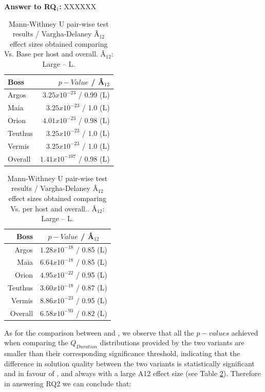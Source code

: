 \textbf{Answer to RQ$_1$:}   XXXXXX


\begin{table}[tb]
	\centering
	\caption{Mann-Withney U pair-wise test results / Vargha-Delaney Â$_{12}$ effect sizes obtained comparing \simhotep{} Vs. Base per host and overall. Â$_{12}$: Large -- L.}
	\label{tab:resultsWilcEffRQ1}
	\begin{tabular}{@{}lr@{}}
		\toprule
		Boss    & $p-Value$ / Â$_{12}$           \\ \midrule 
		Argos   & $3.25x10^{-23}$  / 0.99 (L)    \\
		Maia    & $3.25x10^{-23}$  /  1.0 (L)    \\
		Orion   & $4.01x10^{-23}$  / 0.98 (L)    \\
		Teuthus & $3.25x10^{-23}$  /  1.0 (L)    \\
		Vermis  & $3.25x10^{-23}$  /  1.0 (L)    \\
		Overall & $1.41x10^{-107}$ / 0.98 (L)    \\
		\bottomrule
	\end{tabular}
\end{table}

\begin{table}[tb]
    \centering
    \caption{Mann-Withney U pair-wise test results / Vargha-Delaney Â$_{12}$ effect sizes obtained comparing \simhotep{} Vs. \timhotep{} per host and overall.. Â$_{12}$: Large -- L.}
	\label{tab:resultsWilcEffRQ2}
    \begin{tabular}{@{}rc@{}}
    \toprule
    Boss    & $p-Value$ / Â$_{12}$           \\ \midrule 
    Argos   & $1.28x10^{-18}$ / 0.85 (L)     \\
    Maia    & $6.64x10^{-18}$ / 0.85 (L)     \\
    Orion   & $4.95x10^{-22}$ / 0.95 (L)     \\
    Teuthus & $3.60x10^{-18}$ / 0.87 (L)     \\
    Vermis  & $8.86x10^{-23}$ / 0.95 (L)     \\
    Overall & $6.58x10^{-93}$ / 0.82 (L)     \\
    \bottomrule
    \end{tabular}
    \end{table}
    
As for the comparison between \simhotep{} and \timhotep{},  we observe that all the $p-values$ achieved when comparing the $Q_{Duration}$ distributions provided by the two variants are smaller than their corresponding significance threshold, indicating that the difference in solution quality between the two variants is statistically significant and in favour of \simhotep{}, and always with a large A12 effect size (see Table \ref{tab:resultsWilcEffRQ2}). Therefore in answering RQ2 we can conclude that:


